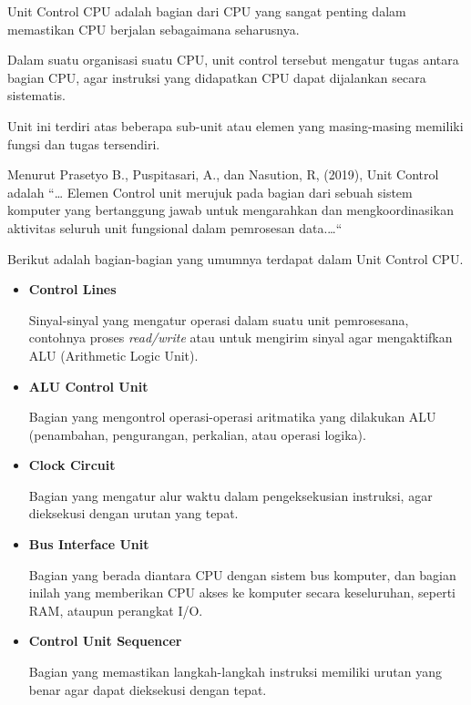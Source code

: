 Unit Control CPU adalah bagian dari CPU yang sangat penting dalam memastikan CPU
berjalan sebagaimana seharusnya.

Dalam suatu organisasi suatu CPU, unit control tersebut mengatur tugas antara
bagian CPU, agar instruksi yang didapatkan CPU dapat dijalankan secara sistematis.

Unit ini terdiri atas beberapa sub-unit atau elemen yang masing-masing memiliki
fungsi dan tugas tersendiri.

Menurut Prasetyo B., Puspitasari, A., dan Nasution, R, (2019), Unit Control adalah ``\dots{}
Elemen Control unit merujuk pada bagian dari sebuah sistem komputer yang bertanggung jawab
untuk mengarahkan dan mengkoordinasikan aktivitas seluruh unit fungsional dalam pemrosesan data.\dots{}``

Berikut adalah bagian-bagian yang umumnya terdapat dalam Unit Control CPU.

\begin{itemize}


  \item \textbf{ Control Lines}

    Sinyal-sinyal yang mengatur operasi dalam suatu unit pemrosesana, contohnya
    proses \textit{read/write} atau untuk mengirim sinyal agar mengaktifkan ALU
    (Arithmetic Logic Unit).

  \item \textbf{ ALU Control Unit}

    Bagian yang mengontrol operasi-operasi aritmatika yang dilakukan ALU
    (penambahan, pengurangan, perkalian, atau operasi logika).


  \item \textbf{ Clock Circuit }

    Bagian yang mengatur alur waktu dalam pengeksekusian instruksi, agar
    dieksekusi dengan urutan yang tepat.

  \item \textbf{ Bus Interface Unit }

    Bagian yang berada diantara CPU dengan sistem bus komputer, dan bagian inilah
    yang memberikan CPU akses ke komputer secara keseluruhan, seperti RAM, ataupun
    perangkat I/O.

  \item \textbf{ Control Unit Sequencer }

    Bagian yang memastikan langkah-langkah instruksi memiliki urutan yang benar
    agar dapat dieksekusi dengan tepat.

\end{itemize}

